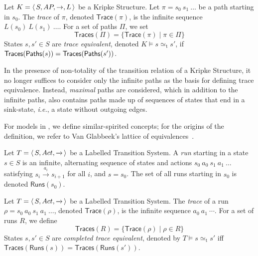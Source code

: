 \documentclass{llncs}
\newcommand{\ltstrans}[1]{\xrightarrow{#1}}
\newcommand{\kstrans}{\to}
\newcommand{\ie}{\emph{i.e.}}
\begin{document}
\newcommand{\trace}[1]{\ensuremath{\mathsf{Trace}(#1)}}
\newcommand{\traces}[1]{\ensuremath{\mathsf{Traces}(#1)}}
\newcommand{\traceeq}{\ensuremath{\simeq_{\mathrm{t}}}}

\begin{definition} Let $K = \tuple{S, \AP, \kstrans, L}$ be a Kripke
Structure. Let $\pi = s_0\ s_1\ \ldots$ be a path starting in $s_0$. The
\emph{trace} of $\pi$, denoted $\trace{\pi}$, is the infinite sequence
$L(s_0)\ L(s_1)\ \ldots$.  For a set of paths $\Pi$, we set
$$\traces{\Pi} = \{ \trace{\pi} \mid \pi \in  \Pi\}$$
States $s,s' \in S$ are \emph{trace equivalent}, denoted $K \models
s \traceeq s'$, if $\traces{\paths{s}} = \traces{\paths{s'}}$.
\end{definition}

\begin{remark} In the presence of non-totality of the transition relation
of a Kripke Structure, it no longer suffices to consider only the
infinite paths as the basis for defining trace equivalence. Instead,
\emph{maximal} paths are considered, which in addition to the infinite
paths, also contains paths made up of sequences of states that end in
a sink-state, \ie, a state without outgoing edges.
\end{remark}
For models in \LTS, we define similar-spirited concepts; for the
origins of the definition, we refer to Van Glabbeek's lattice of
equivalences~\cite{vanGlabbeek01}.


\newcommand{\runs}[1]{\ensuremath{\mathsf{Runs}(#1)}}
\newcommand{\bareruns}[1]{\ensuremath{\mathsf{Runs_b}(#1)}}
\begin{definition} Let $T = \tuple{S, \act,\ltstrans{}}$ be a Labelled
Transition System.  A \emph{run} starting in a state $s \in S$ is an
infinite, alternating sequence of states and actions $s_0\ a_0\ s_1\
a_1\ \ldots$ satisfying $s_i \ltstrans{a_i} s_{i+1}$ for all $i$, and
$s = s_0$.  The set of all runs starting in $s_0$ is denoted $\runs{s_0}$.

\end{definition}


\begin{definition} Let $T = \tuple{S, \act, \ltstrans{}}$ be a Labelled
Transition System.  The \emph{trace} of a run $\rho = s_0\ a_0\
s_1\ a_1\ \ldots$, denoted $\trace{\rho}$, is the infinite sequence
$a_0\ a_1\ \cdots$.  For a set of runs $R$, we define
$$\traces{R} = \{ \trace{\rho} \mid \rho \in R \}$$
States $s,s' \in S$ are \emph{completed trace equivalent}, denoted by
$T \models s \traceeq s'$ iff $\traces{\runs{s}} = \traces{\runs{s'}}$.

\end{definition}
\end{document}
